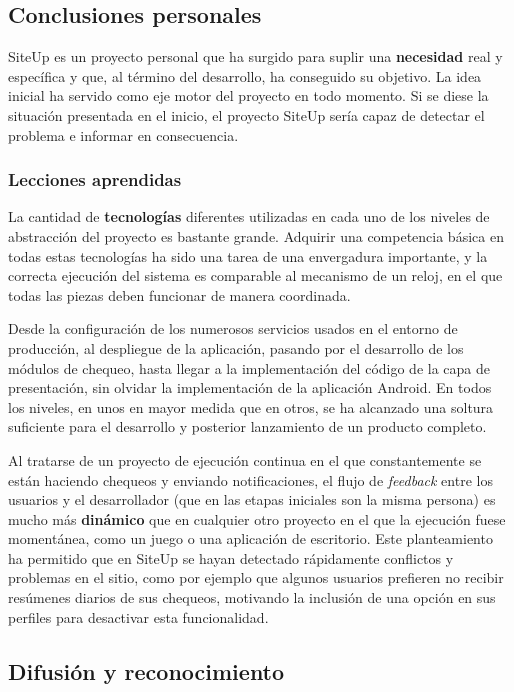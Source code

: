 \documentclass[a4paper,12pt]{article}
\begin{document}
\subsection{Conclusiones personales}

SiteUp es un proyecto personal que ha surgido para suplir una \textbf{necesidad}
real y específica y que, al término del desarrollo, ha conseguido su
objetivo. La idea inicial ha servido como eje motor del proyecto en todo
momento. Si se diese la situación presentada en el inicio, el proyecto SiteUp
sería capaz de detectar el problema e informar en consecuencia.


\subsubsection{Lecciones aprendidas}

La cantidad de \textbf{tecnologías} diferentes utilizadas en cada uno de los
niveles de abstracción del proyecto es bastante grande. Adquirir una competencia
básica en todas estas tecnologías ha sido una tarea de una envergadura
importante, y la correcta ejecución del sistema es comparable al mecanismo de un
reloj, en el que todas las piezas deben funcionar de manera coordinada.

Desde la configuración de los numerosos servicios usados en el entorno de
producción, al despliegue de la aplicación, pasando por el desarrollo de los
módulos de chequeo, hasta llegar a la implementación del código de la capa de
presentación, sin olvidar la implementación de la aplicación Android. En todos
los niveles, en unos en mayor medida que en otros, se ha alcanzado una soltura
suficiente para el desarrollo y posterior lanzamiento de un producto completo.

Al tratarse de un proyecto de ejecución continua en el que constantemente se
están haciendo chequeos y enviando notificaciones, el flujo de \textit{feedback}
entre los usuarios y el desarrollador (que en las etapas iniciales son la misma
persona) es mucho más \textbf{dinámico} que en cualquier otro proyecto en el que
la ejecución fuese momentánea, como un juego o una aplicación de
escritorio. Este planteamiento ha permitido que en SiteUp se hayan detectado
rápidamente conflictos y problemas en el sitio, como por ejemplo que algunos
usuarios prefieren no recibir resúmenes diarios de sus chequeos, motivando la
inclusión de una opción en sus perfiles para desactivar esta funcionalidad.

\subsection{Difusión y reconocimiento}
\end{document}
